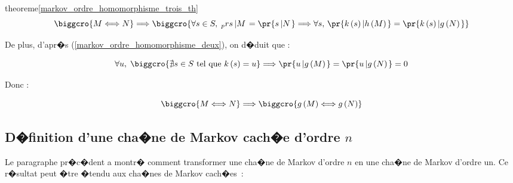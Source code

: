 \begin{xdemo}{theoreme}{\ref{markov_ordre_homomorphisme_trois_th}}
        $$
        \biggcro{M \Longleftrightarrow N } \Longrightarrow  \biggcro{ \forall s \in S ,\; 
                _pr{  s\left| M\right.  }
        = \pr{   s\left| N\right.
        } \Longrightarrow \forall s,\, \pr{   k\left(  s\right)  \left| h\left( M\right) \right. } 
        = \pr{  k\left(  s\right) \left|
        g\left( N\right)  \right. }}
        $$

De plus, d'apr�s (\ref{markov_ordre_homomorphisme_deux}), on d�duit que :

        $$
        \forall u,\; \biggcro{  \nexists s \in S \text{ tel que }k\left(  s\right)  =u } \Longrightarrow \pr{
         u\left|  g\left(  M\right) \right.
        } = \pr{  u\left|  g\left(  N\right)  \right.  }  =0
        $$

Donc :

        $$
        \biggcro { M\Longleftrightarrow N }  \Longrightarrow \biggcro{ g\left( M\right) 
         \Longleftrightarrow g\left(  N\right)  }
        $$

\end{xdemo}









\subsection{D�finition d'une cha�ne de Markov cach�e d'ordre $n$}

Le paragraphe pr�c�dent a montr� comment transformer une cha�ne de Markov d'ordre $n$ en une cha�ne de Markov d'ordre un. Ce r�sultat peut �tre �tendu aux cha�nes de Markov cach�es~:

